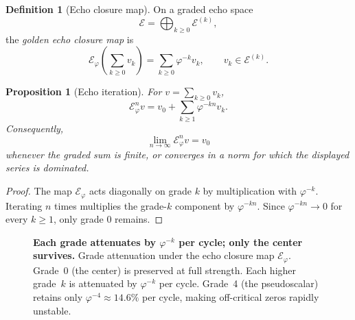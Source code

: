 \documentclass[11pt,a4paper]{article}
\theoremstyle{plain}
\newtheorem{proposition}[theorem]{Proposition}
\theoremstyle{definition}
\newtheorem{definition}[theorem]{Definition}
\theoremstyle{remark}
\numberwithin{equation}{section}
\newcommand{\vp}{\varphi}
\newcommand{\EF}{\mathcal{E}}
\begin{document}
\begin{definition}[Echo closure map]
\label{def:echo-map}
On a graded echo space
\[
  \EF=\bigoplus_{k\ge0}\EF^{(k)},
\]
the \emph{golden echo closure map} is
\[
  \mathcal E_\vp\!\left(\sum_{k\ge0}v_k\right)
  =
  \sum_{k\ge0}\vp^{-k}v_k,
  \qquad v_k\in\EF^{(k)}.
\]
\end{definition}

\begin{proposition}[Echo iteration]
\label{prop:echo-iteration}
For \(v=\sum_{k\ge0}v_k\),
\[
  \mathcal E_\vp^n v
  =
  v_0+\sum_{k\ge1}\vp^{-kn}v_k.
\]
Consequently,
\[
  \lim_{n\to\infty}\mathcal E_\vp^n v=v_0
\]
whenever the graded sum is finite, or converges in a norm for which the
displayed series is dominated.
\end{proposition}

\begin{proof}
The map \(\mathcal E_\vp\) acts diagonally on grade \(k\) by
multiplication with \(\vp^{-k}\).  Iterating \(n\) times multiplies the
grade-\(k\) component by \(\vp^{-kn}\).  Since \(\vp^{-kn}\to0\) for
every \(k\ge1\), only grade \(0\) remains.
\end{proof}

\begin{figure}[ht]
\centering
{}
\caption{\textbf{Each grade attenuates by \(\varphi^{-k}\) per cycle; only
the center survives.}
Grade attenuation under the echo closure map \(\mathcal
E_\varphi\).  Grade~0 (the center) is preserved at full strength.
Each higher grade~\(k\) is attenuated by \(\varphi^{-k}\) per cycle.
Grade~4 (the pseudoscalar) retains only
\(\varphi^{-4}\approx14.6\%\) per cycle, making off-critical zeros
rapidly unstable.}
\label{fig:grade-attenuation}
\end{figure}
\end{document}

